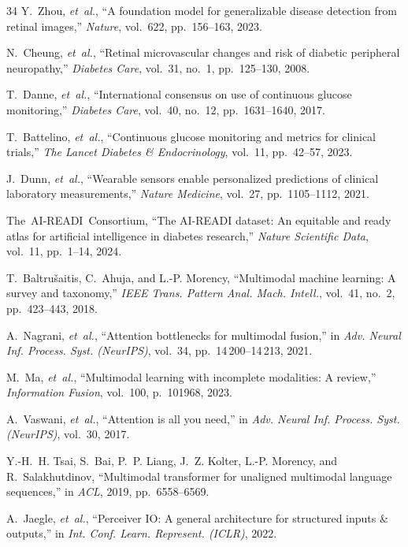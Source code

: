 \documentclass[journal,10pt,twocolumn]{IEEEtran}
\begin{document}
\begin{thebibliography}{34}
Y.~Zhou, \emph{et~al.}, ``A foundation model for generalizable disease detection from retinal images,'' \emph{Nature}, vol.~622, pp.~156--163, 2023.

N.~Cheung, \emph{et~al.}, ``Retinal microvascular changes and risk of diabetic peripheral neuropathy,'' \emph{Diabetes Care}, vol.~31, no.~1, pp.~125--130, 2008.

T.~Danne, \emph{et~al.}, ``International consensus on use of continuous glucose monitoring,'' \emph{Diabetes Care}, vol.~40, no.~12, pp.~1631--1640, 2017.

T.~Battelino, \emph{et~al.}, ``Continuous glucose monitoring and metrics for clinical trials,'' \emph{The Lancet Diabetes \& Endocrinology}, vol.~11, pp.~42--57, 2023.

J.~Dunn, \emph{et~al.}, ``Wearable sensors enable personalized predictions of clinical laboratory measurements,'' \emph{Nature Medicine}, vol.~27, pp.~1105--1112, 2021.

The~AI-READI~Consortium, ``The AI-READI dataset: An equitable and ready atlas for artificial intelligence in diabetes research,'' \emph{Nature Scientific Data}, vol.~11, pp.~1--14, 2024.

T.~Baltru{\v{s}}aitis, C.~Ahuja, and L.-P. Morency, ``Multimodal machine learning: A survey and taxonomy,'' \emph{IEEE Trans. Pattern Anal. Mach. Intell.}, vol.~41, no.~2, pp.~423--443, 2018.

A.~Nagrani, \emph{et~al.}, ``Attention bottlenecks for multimodal fusion,'' in \emph{Adv. Neural Inf. Process. Syst. (NeurIPS)}, vol.~34, pp.~14\,200--14\,213, 2021.

M.~Ma, \emph{et~al.}, ``Multimodal learning with incomplete modalities: A review,'' \emph{Information Fusion}, vol.~100, p.~101968, 2023.

A.~Vaswani, \emph{et~al.}, ``Attention is all you need,'' in \emph{Adv. Neural Inf. Process. Syst. (NeurIPS)}, vol.~30, 2017.

Y.-H.~H. Tsai, S.~Bai, P.~P. Liang, J.~Z. Kolter, L.-P. Morency, and R.~Salakhutdinov, ``Multimodal transformer for unaligned multimodal language sequences,'' in \emph{ACL}, 2019, pp.~6558--6569.

A.~Jaegle, \emph{et~al.}, ``Perceiver IO: A general architecture for structured inputs \& outputs,'' in \emph{Int. Conf. Learn. Represent. (ICLR)}, 2022.


\end{thebibliography}
\end{document}
